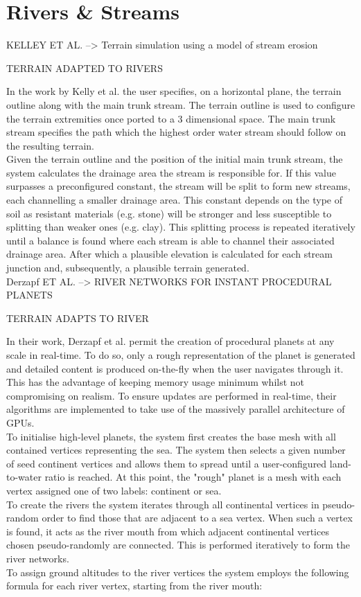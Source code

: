 \section{Rivers \& Streams}

KELLEY ET AL. --> Terrain simulation using a model of stream erosion

TERRAIN ADAPTED TO RIVERS

In the work by Kelly et al. the user specifies, on a horizontal plane, the terrain outline along with the main trunk stream. The terrain outline is used to configure the terrain extremities once ported to a 3 dimensional space. The main trunk stream specifies the path which the highest order water stream should follow on the resulting terrain.\\
Given the terrain outline and the position of the initial main trunk stream, the system calculates the drainage area the stream is responsible for. If this value surpasses a preconfigured constant, the stream will be split to form new streams, each channelling a smaller drainage area. This constant depends on the type of soil as resistant materials (e.g. stone) will be stronger and less susceptible to splitting than weaker ones (e.g. clay). This splitting process is repeated iteratively until a balance is found where each stream is able to channel their associated drainage area. After which a plausible elevation is calculated for each stream junction and, subsequently, a plausible terrain generated.\\


Derzapf ET AL. --> RIVER NETWORKS FOR INSTANT PROCEDURAL PLANETS

TERRAIN ADAPTS TO RIVER

In their work, Derzapf et al. permit the creation of procedural planets at any scale in real-time. To do so, only a rough representation of the planet is generated and detailed content is produced on-the-fly when the user navigates through it. This has the advantage of keeping memory usage minimum whilst not compromising on realism. To ensure updates are performed in real-time, their algorithms are implemented to take use of the massively parallel architecture of GPUs. \\
To initialise high-level planets, the system first creates the base mesh with all contained vertices representing the sea. The system then selects a given number of seed continent vertices and allows them to spread until a user-configured land-to-water ratio is reached. At this point, the "rough" planet is a mesh with each vertex assigned one of two labels: continent or sea.\\
To create the rivers the system iterates through all continental vertices in pseudo-random order to find those that are adjacent to a sea vertex. When such a vertex is found, it acts as the river mouth from which adjacent continental vertices chosen pseudo-randomly are connected. This is performed iteratively to form the river networks.\\
To assign ground altitudes to the river vertices the system employs the following formula for each river vertex, starting from the river mouth:


